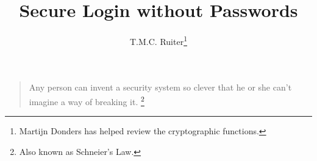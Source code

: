 \documentclass[a4paper]{article}%
\title{Secure Login without Passwords}
\author{T.M.C. Ruiter\thanks{Martijn Donders has helped review the cryptographic functions.}}
\begin{document}
\maketitle
\begin{quote}
Any person can invent a security system so clever that he or she can't imagine a way of breaking it.%
\footnote{Also known as Schneier's Law.}
\end{quote}

\newpage
\tableofcontents
\newpage









\end{document}
